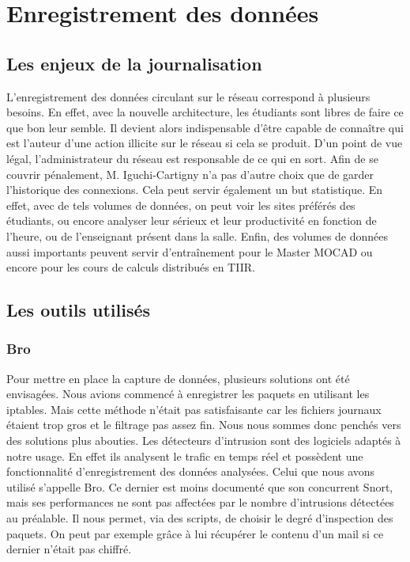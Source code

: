 \chapter{Enregistrement des données}
\label{chap:Enregistrement des données}

\section{Les enjeux de la journalisation}

L'enregistrement des données circulant sur le réseau correspond à plusieurs besoins. En effet, avec la nouvelle architecture, les étudiants sont libres de faire ce que bon leur semble. Il devient alors indispensable d'être capable de connaître qui est l'auteur d'une action illicite sur le réseau si cela se produit. D'un point de vue légal, l'administrateur du réseau est responsable de ce qui en sort. Afin de se couvrir pénalement, M. Iguchi-Cartigny n'a pas d'autre choix que de garder l'historique des connexions.
Cela peut servir également un but statistique. En effet, avec de tels volumes de données, on peut voir les sites préférés des étudiants, ou encore analyser leur sérieux et leur productivité en fonction de l'heure, ou de l'enseignant présent dans la salle.
Enfin, des volumes de données aussi importants peuvent servir d'entraînement pour le Master MOCAD ou encore pour les cours de calculs distribués en TIIR.

\section{Les outils utilisés}

\subsection{Bro}

Pour mettre en place la capture de données, plusieurs solutions ont été envisagées. Nous avions commencé à enregistrer les paquets en utilisant les iptables. Mais cette méthode n'était pas satisfaisante car les fichiers journaux étaient trop gros et le filtrage pas assez fin. Nous nous sommes donc penchés vers des solutions plus abouties. Les détecteurs d'intrusion sont des logiciels adaptés à notre usage. En effet ils analysent le trafic en temps réel et possèdent une fonctionnalité d'enregistrement des données analysées. Celui que nous avons utilisé s'appelle Bro. Ce dernier est moins documenté que son concurrent Snort, mais ses performances ne sont pas affectées par le nombre d'intrusions détectées au préalable. Il nous permet, via des scripts, de choisir le degré d'inspection des paquets. On peut par exemple grâce à lui récupérer le contenu d'un mail si ce dernier n'était pas chiffré.

